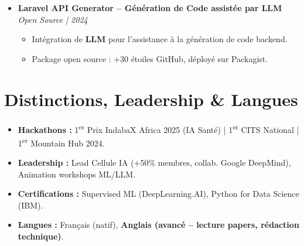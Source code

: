 \documentclass[a4paper,11pt]{article}
\begin{document}
\begin{itemize}[leftmargin=*, label={-}]
\item \textbf{Laravel API Generator -- Génération de Code assistée par LLM} \hfill \textit{Open Source | 2024}
\vspace{-2pt}
    \begin{itemize}[leftmargin=0.4cm, nosep, label=\tiny$\bullet$]
        \item \small{Intégration de \textbf{LLM} pour l'assistance à la génération de code backend.}
        \item \small{Package open source : +30 étoiles GitHub, déployé sur Packagist.}
    \end{itemize}

\end{itemize}

\section{Distinctions, Leadership \& Langues}
\begin{itemize}[leftmargin=*, nosep]
    \item \textbf{Hackathons :} 1\textsuperscript{er} Prix IndabaX Africa 2025 (IA Santé) | 1\textsuperscript{er} CITS National | 1\textsuperscript{er} Mountain Hub 2024.
    \item \textbf{Leadership :} Lead Cellule IA (+50\% membres, collab. Google DeepMind), Animation workshops ML/LLM.
    \item \textbf{Certifications :} Supervised ML (DeepLearning.AI), Python for Data Science (IBM).
    \item \textbf{Langues :} Français (natif), \textbf{Anglais (avancé -- lecture papers, rédaction technique)}.
\end{itemize}
\end{document}
